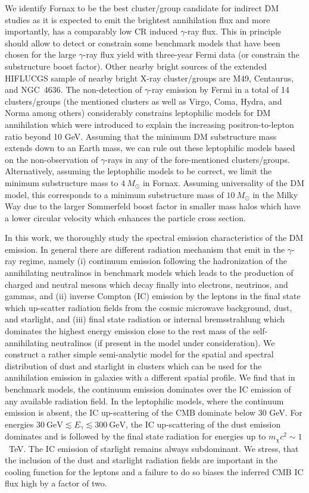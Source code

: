 \documentclass[10pt,aps,pra,reprint,amsmath,amsfonts,amssymb,showpacs]{revtex4-1}
\newcommand{\msun}{M_\odot}
\begin{document}
We identify Fornax to be the best cluster/group candidate for indirect DM
studies as it is expected to emit the brightest annihilation flux and more
importantly, has a comparably low CR induced $\gamma$-ray flux.  This in
principle should allow to detect or constrain some benchmark models that have
been chosen for the large $\gamma$-ray flux yield with three-year Fermi data
(or constrain the substructure boost factor). Other nearby bright sources of the
extended HIFLUCGS sample of nearby bright X-ray cluster/groups are M49,
Centaurus, and NGC~4636.  The non-detection of $\gamma$-ray emission by Fermi in
a total of 14 clusters/groups (the mentioned clusters as well as Virgo, Coma,
Hydra, and Norma among others) considerably constrains leptophilic models for DM
annihilation which were introduced to explain the increasing positron-to-lepton
ratio beyond 10 GeV. Assuming that the minimum DM substructure mass extends down
to an Earth mass, we can rule out these leptophilic models based on the
non-observation of $\gamma$-rays in any of the fore-mentioned
clusters/groups. Alternatively, assuming the leptophilic models to be correct,
we limit the minimum substructure mass to $4~\msun$ in Fornax. Assuming
universality of the DM model, this corresponds to a minimum substructure mass of
$10~\msun$ in the Milky Way due to the larger Sommerfeld boost factor in smaller
mass halos which have a lower circular velocity which enhances the particle
cross section.

In this work, we thoroughly study the spectral emission characteristics of the
DM emission. In general there are different radiation mechanism that emit in the
$\gamma$-ray regime, namely (i) continuum emission following the hadronization
of the annihilating neutralinos in benchmark models which leads to the
production of charged and neutral mesons which decay finally into electrons,
neutrinos, and gammas, and (ii) inverse Compton (IC) emission by the leptons in
the final state which up-scatter radiation fields from the cosmic microwave
background, dust, and starlight, and (iii) final state radiation or internal
bremsstrahlung which dominates the highest energy emission close to the rest
mass of the self-annihilating neutralinos (if present in the model under
consideration). We construct a rather simple semi-analytic model for the spatial
and spectral distribution of dust and starlight in clusters which can be used
for the annihilation emission in galaxies with a different spatial profile.  We
find that in benchmark models, the continuum emission dominates over the IC
emission of any available radiation field. In the leptophilic models, where the
continuum emission is absent, the IC up-scattering of the CMB dominate below 30
GeV. For energies $30~\mathrm{GeV} \lesssim E_\gamma \lesssim 300~\mathrm{GeV}$,
the IC up-scattering of the dust emission dominates and is followed by the final
state radiation for energies up to $m_\chi c^2 \sim 1$~TeV. The IC emission of
starlight remains always subdominant. We stress, that the inclusion of the dust
and starlight radiation fields are important in the cooling function for the
leptons and a failure to do so biases the inferred CMB IC flux high by a factor
of two.
\end{document}
